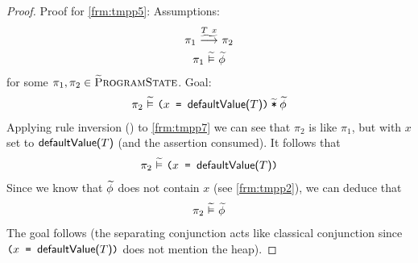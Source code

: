 \begin{proof}
    Proof for \ref{frm:tmpp5}:
    Assumptions:
    \begin{gather}
    \label{frm:tmpp7}
    \gsstepConsume{\sDeclare {${T}$} {${x}$}}{\pi_1}{\pi_2}\\
    \label{frm:tmpp8}
    \evalgphiGen {\pi_1} {\grad{\phi}}
    \end{gather}
    for some $\pi_1, \pi_2 \in \textup{\textsc{\ensuremath{\widetilde{\text{P}}}rogramState}}$.
    Goal:
    \begin{gather}
    \pi_2 \,\,\widetilde{\vDash}\,\, \textup{\texttt{${\textup{\texttt{(${\textup{\texttt{${x}$}}}$ = ${\textup{\texttt{${\textup{\textmd{\textsf{defaultValue(${T}$)}}}}$}}}$)}}}$\:$\widetilde{\textup{\texttt{*}}}$\:$\widetilde{\phi}$}}
    \end{gather}
    Applying rule inversion () to \ref{frm:tmpp7} we can see that $\pi_2$ is like $\pi_1$, but with $x$ set to $\textup{\textmd{\textsf{defaultValue(${T}$)}}}$ (and the assertion consumed).
    It follows that
    \begin{gather}
    \pi_2 \,\,\widetilde{\vDash}\,\, \textup{\texttt{(${\textup{\texttt{${x}$}}}$ = ${\textup{\texttt{${\textup{\textmd{\textsf{defaultValue(${T}$)}}}}$}}}$)}}
    \end{gather}
    Since we know that $\widetilde{\phi}$ does not contain $x$ (see \ref{frm:tmpp2}), we can deduce that
    \begin{gather}
    \pi_2 \,\,\widetilde{\vDash}\,\, \widetilde{\phi}
    \end{gather}
    The goal follows (the separating conjunction acts like classical conjunction since ${\textup{\texttt{(${\textup{\texttt{${x}$}}}$ = ${\textup{\texttt{${\textup{\textmd{\textsf{defaultValue(${T}$)}}}}$}}}$)}}}$ does not mention the heap).
\end{proof}

